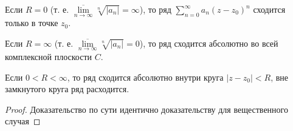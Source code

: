Если $R = 0$ (т. е. $\overline{\lim\limits_{n\to\infty}}\sqrt[n]{|a_n|} = \infty$), то ряд $\displaystyle\sum_{n=0}^{\infty}a_n(z-z_0)^n$ сходится только в точке $z_0$.

Если $R = \infty$ (т. е. $\overline{\lim\limits_{n\to\infty}}\sqrt[n]{|a_n|} = 0$), то ряд сходится абсолютно во всей комплексной плоскости $C$.

Если $0 < R < \infty$, то ряд сходится абсолютно внутри круга $|z-z_0| < R$, вне замкнутого круга ряд расходится.


\begin{proof}
Доказательство по сути идентично доказательству для вещественного случая
\end{proof}
